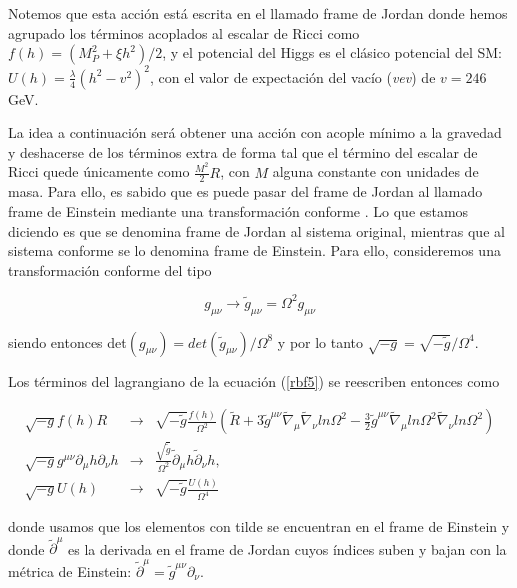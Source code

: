 Notemos que esta acción está escrita en el llamado frame de Jordan \citep{2014PhRvD..90j3516P} donde hemos agrupado los términos acoplados al escalar de Ricci como $f(h)=(M^{2}_{P}+\xi h^{2})/2$, y el potencial del Higgs es el clásico potencial del SM: $U(h)=\frac{\lambda}{4}(h^{2}-v^{2})^{2}$, con el valor de expectación del vacío (\textit{vev}) de $v=246$ GeV.

La idea a continuación será obtener una acción con acople mínimo a la gravedad y deshacerse de los términos extra de forma tal que el término del escalar de Ricci quede únicamente como $\frac{M^{2}}{2} R$, con $M$ alguna constante con unidades de masa. Para ello, es sabido que es puede pasar del frame de Jordan al llamado frame de Einstein mediante una transformación conforme \citep{2012AIPC.1471..103F}. Lo que estamos diciendo es que se denomina frame de Jordan al sistema original, mientras que al sistema conforme se lo denomina frame de Einstein. Para ello, consideremos una transformación conforme del tipo


\begin{equation}
g_{\mu \nu} \rightarrow \widetilde{g}_{\mu \nu}= \Omega^{2}g_{\mu \nu}
\label{rbf7}
\end{equation}


siendo entonces det$(g_{\mu \nu})=det(\widetilde{g}_{\mu \nu})/\Omega ^{8}$ y por lo tanto $\sqrt{-g}=\sqrt{-\widetilde{g}}/\Omega ^{4}$.


Los términos del lagrangiano de la ecuación (\ref{rbf5}) se reescriben entonces como


\begin{eqnarray}\label{relacioneseinteinframe}
\sqrt{-g} f(h) R &\rightarrow& \sqrt{-\widetilde{g}} \frac{f(h)}{\Omega ^{2} } \left( \widetilde{R}+3\widetilde{g}^{\mu \nu}  \widetilde{\nabla}_{\mu}\widetilde{\nabla}_{\nu} ln \Omega ^{2} -\frac{3}{2} \widetilde{g}^{\mu \nu} \widetilde{\nabla}_{\mu} ln \Omega ^{2}  \widetilde{\nabla}_{\nu} ln \Omega ^{2} \right)\\
\sqrt{-g} g^{\mu \nu} \partial _{\mu}h \partial _{\nu}h &\rightarrow& \frac{\sqrt{\widetilde{g}}}{\Omega ^{2}} \widetilde{\partial}_{\mu}h \widetilde{\partial}_{\nu}h,\\
\sqrt{-g} U(h) &\rightarrow& \sqrt{-\widetilde{g}} \frac{U(h)}{\Omega^{4}}
\end{eqnarray}


donde usamos que los elementos con tilde se encuentran en el frame de Einstein y donde $\widetilde{\partial}^{\mu}$ es la derivada en el frame de Jordan cuyos índices suben y bajan con la métrica de Einstein: $\widetilde{\partial}^{\mu}=\widetilde{g}^{\mu \nu} \partial _{\nu}$.


